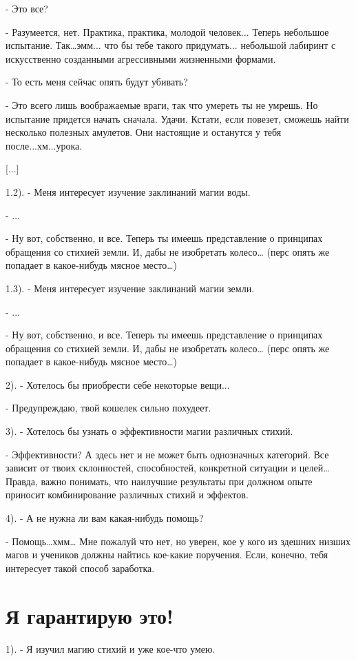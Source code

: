 \documentclass[12pt,a4paper]{book}
\begin{document}
- Это все?

- Разумеется, нет. Практика, практика, молодой человек... Теперь небольшое испытание. Так…эмм... что бы тебе такого придумать... небольшой лабиринт с искусственно созданными агрессивными жизненными формами.

- То есть меня сейчас опять будут убивать?

- Это всего лишь воображаемые враги, так что умереть ты не умрешь. Но испытание придется начать сначала. Удачи. Кстати, если повезет, сможешь найти несколько полезных амулетов. Они настоящие и останутся у тебя после...хм...урока.

[...]

1.2). - Меня интересует изучение заклинаний магии воды.

- ...

- Ну вот, собственно, и все. Теперь ты имеешь представление о принципах обращения со стихией земли. И, дабы не изобретать колесо… (перс опять же попадает в какое-нибудь мясное место…)

1.3). - Меня интересует изучение заклинаний магии земли.

- ...

- Ну вот, собственно, и все. Теперь ты имеешь представление о принципах обращения со стихией земли. И, дабы не изобретать колесо… (перс опять же попадает в какое-нибудь мясное место…)

2). - Хотелось бы приобрести себе некоторые вещи...

- Предупреждаю, твой кошелек сильно похудеет.

3). - Хотелось бы узнать о эффективности магии различных стихий.

- Эффективности? А здесь нет и не может быть однозначных категорий. Все зависит от твоих склонностей, способностей, конкретной ситуации и целей… Правда, важно понимать, что наилучшие результаты при должном опыте приносит комбинирование различных стихий и эффектов.

4). - А не нужна ли вам какая-нибудь помощь?

- Помощь…хмм… Мне пожалуй что нет, но уверен, кое у кого из здешних низших магов и учеников должны найтись кое-какие поручения. Если, конечно, тебя интересует такой способ заработка.

\section{Я гарантирую это!}

1). - Я изучил магию стихий и уже кое-что умею.
\end{document}
